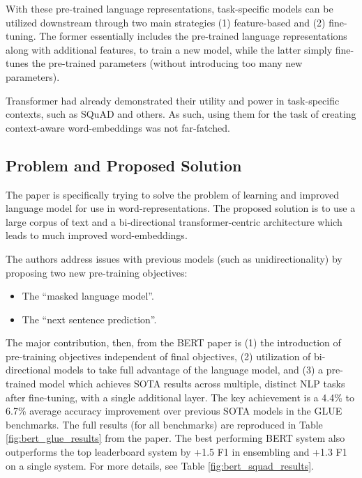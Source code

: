 \documentclass{article}
\begin{document}
With these pre-trained language representations, task-specific models can be utilized downstream through two main strategies (1) feature-based and (2) fine-tuning. The former essentially includes the pre-trained language representations along with additional features, to train a new model, while the latter simply fine-tunes the pre-trained parameters (without introducing too many new parameters).

Transformer had already demonstrated their utility and power in task-specific contexts, such as SQuAD and others. As such, using them for the task of creating context-aware word-embeddings was not far-fatched.

\subsection{Problem and Proposed Solution}
The paper \cite{BERT} is specifically trying to solve the problem of learning and improved language model for use in word-representations. The proposed solution is to use a large corpus of text and a bi-directional transformer-centric architecture which leads to much improved word-embeddings.

The authors address issues with previous models (such as unidirectionality) by proposing two new pre-training objectives:
\begin{itemize}
    \item The ``masked language model''. 
    \item The ``next sentence prediction''.
\end{itemize}

The major contribution, then, from the BERT paper is (1) the introduction of pre-training objectives independent of final objectives, (2) utilization of bi-directional models to take full advantage of the language model, and (3) a pre-trained model which achieves SOTA results across multiple, distinct NLP tasks after fine-tuning, with a single additional layer. The key achievement is a 4.4\% to 6.7\% average accuracy improvement over previous SOTA models in the GLUE benchmarks. The full results (for all benchmarks) are reproduced in Table \ref{fig:bert_glue_results} from the paper. The best performing BERT system also outperforms the top leaderboard system by +1.5 F1 in ensembling and +1.3 F1 on a single system. For more details, see Table \ref{fig:bert_squad_results}. 
\end{document}
